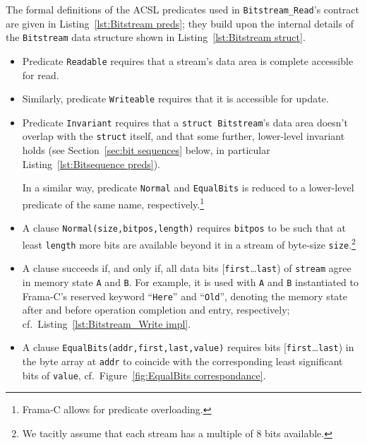 The formal definitions of the ACSL predicates used
in \lstinline{Bitstream_Read}'s contract are given in
Listing~\ref{lst:Bitstream preds}; they build upon the internal
details of the \lstinline{Bitstream} data structure shown in
Listing~\ref{lst:Bitstream struct}.
%
\begin{itemize}
\item Predicate \lstinline{Readable} requires that a stream's data area is
	complete accessible for read.
\item Similarly, predicate \lstinline{Writeable} requires that it is
	accessible for update.

\item Predicate \lstinline{Invariant} requires that a 
	\lstinline{struct Bitstream}'s data area
	doesn't overlap with the \lstinline{struct} itself, and that some
	further, lower-level invariant holds (see 
	Section~\ref{sec:bit sequences} below, in particular
	Listing~\ref{lst:Bitsequence preds}).

	In a similar way, predicate \lstinline{Normal} and
	\lstinline{EqualBits} is reduced to a
	lower-level predicate of the same 
	name, 
	respectively.\footnote{Frama-C allows for predicate overloading.}

\item
	A clause \lstinline{Normal(size,bitpos,length)} requires
	\lstinline{bitpos} to be such that at least \lstinline{length}
	more bits are available beyond it in a stream of byte-size
	\lstinline{size}.\footnote{
		We tacitly assume that each stream has a multiple of 8 bits
		available.
	}

\item
	A clause
	 succeeds if,
	and only if, 
	all data bits [\lstinline{first}\ldots\lstinline{last})
	of \lstinline{stream} agree in memory state \lstinline{A} and
	\lstinline{B}.
	For example, it is used with \lstinline{A} and \lstinline{B}
	instantiated to Frama-C's reserved keyword ``\lstinline{Here}'' and
	``\lstinline{Old}'', denoting the memory state after and before
	operation completion and entry, respectively; cf.\
	Listing~\ref{lst:Bitstream_Write impl}.

\item
	A clause \lstinline{EqualBits(addr,first,last,value)} requires 
	bits [\lstinline{first}\ldots\lstinline{last}) in
	the byte array at \lstinline{addr} to coincide with the
	corresponding least significant bits of \lstinline{value},
	cf.~Figure~\ref{fig:EqualBits correspondance}.
\end{itemize}


